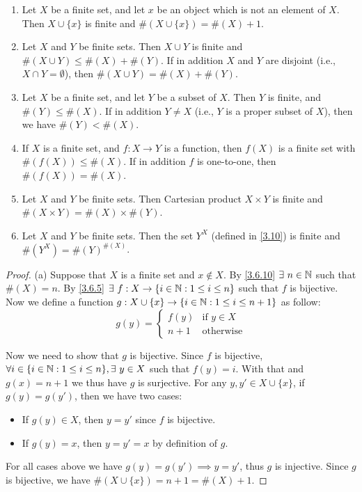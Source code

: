 \begin{prop}\label{3.6.14}
  \leavevmode
  \begin{enumerate}
    \item Let \(X\) be a finite set, and let \(x\) be an object which is not an element of \(X\).
          Then \(X \cup \{x\}\) is finite and \(\#(X \cup \{x\}) = \#(X) + 1\).
    \item Let \(X\) and \(Y\) be finite sets.
          Then \(X \cup Y\) is finite and \(\#(X \cup Y) \leq \#(X) + \#(Y)\).
          If in addition \(X\) and \(Y\) are disjoint (i.e., \(X \cap Y = \emptyset\)), then \(\#(X \cup Y) = \#(X) + \#(Y)\).
    \item Let \(X\) be a finite set, and let \(Y\) be a subset of \(X\).
          Then \(Y\) is finite, and \(\#(Y) \leq \#(X)\).
          If in addition \(Y \neq X\) (i.e., \(Y\) is a proper subset of \(X\)), then we have \(\#(Y) < \#(X)\).
    \item If \(X\) is a finite set, and \(f : X \to Y\) is a function, then \(f(X)\) is a finite set with \(\#(f(X)) \leq \#(X)\).
          If in addition \(f\) is one-to-one, then \(\#(f(X)) = \#(X)\).
    \item Let \(X\) and \(Y\) be finite sets.
          Then Cartesian product \(X \times Y\) is finite and \(\#(X \times Y) = \#(X) \times \#(Y)\).
    \item Let \(X\) and \(Y\) be finite sets.
          Then the set \(Y^X\) (defined in \cref{3.10}) is finite and \(\#(Y^X) = \#(Y)^{\#(X)}\).
  \end{enumerate}
\end{prop}

\begin{proof}{(a)}
  Suppose that \(X\) is a finite set and \(x \notin X\).
  By \cref{3.6.10} \(\exists\ n \in \N\) such that \(\#(X) = n\).
  By \cref{3.6.5} \(\exists\ f : X \to \{i \in \mathbb{N} : 1 \leq i \leq n\}\) such that \(f\) is bijective.
  Now we define a function \(g : X \cup \{x\} \to \{i \in \mathbb{N} : 1 \leq i \leq n + 1\}\) as follow:
  \[
    g(y) = \begin{cases}
      f(y)  & \text{if } y \in X \\
      n + 1 & \text{otherwise}
    \end{cases}
  \]

  Now we need to show that \(g\) is bijective.
  Since \(f\) is bijective, \(\forall i \in \{i \in \mathbb{N} : 1 \leq i \leq n\}, \exists\ y \in X\) such that \(f(y) = i\).
  With that and \(g(x) = n + 1\) we thus have \(g\) is surjective.
  For any \(y, y' \in X \cup \{x\}\), if \(g(y) = g(y')\), then we have two cases:
  \begin{itemize}
    \item If \(g(y) \in X\), then \(y = y'\) since \(f\) is bijective.
    \item If \(g(y) = x\), then \(y = y' = x\) by definition of \(g\).
  \end{itemize}
  For all cases above we have \(g(y) = g(y') \implies y = y'\), thus \(g\) is injective.
  Since \(g\) is bijective, we have \(\#(X \cup \{x\}) = n + 1 = \#(X) + 1\).
\end{proof}

